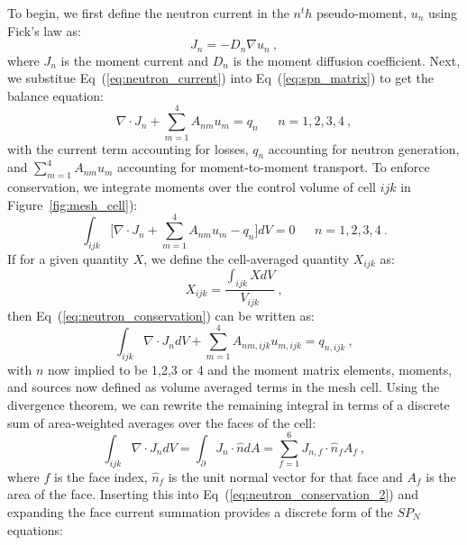 To begin, we first define the neutron current in the $n^th$
pseudo-moment, $u_n$ using Fick's law as:
\begin{equation}
  J_n = -D_n \nabla u_n\:,
  \label{eq:neutron_current}
\end{equation}
where $J_n$ is the moment current and $D_n$ is the moment diffusion
coefficient. Next, we substitue Eq~(\ref{eq:neutron_current}) into
Eq~(\ref{eq:spn_matrix}) to get the balance equation:
\begin{equation}
    \nabla \cdot J_n + \sum_{m=1}^4 A_{nm} u_m = q_n\ \ \ \ \ \ \ n =
    1,2,3,4\:,
  \label{eq:neutron_balance}
\end{equation}
with the current term accounting for losses, $q_n$ accounting for
neutron generation, and $\sum_{m=1}^4 A_{nm} u_m$ accounting for
moment-to-moment transport. To enforce conservation, we integrate
moments over the control volume of cell $ijk$ in Figure~\ref{fig:mesh_cell}):
\begin{equation}
    \int_{ijk} \Bigg[\nabla \cdot J_n + \sum_{m=1}^4 A_{nm} u_m - q_n
      \Bigg] dV = 0 \ \ \ \ \ \ \ n = 1,2,3,4\:.
  \label{eq:neutron_conservation}
\end{equation}
If for a given quantity $X$, we define the cell-averaged quantity
$X_{ijk}$ as:
\begin{equation}
  X_{ijk} = \frac{\int_{ijk} X dV }{V_{ijk}}\:,
  \label{eq:cell_averaged_quant}
\end{equation}
then Eq~(\ref{eq:neutron_conservation}) can be written as:
\begin{equation}
  \int_{ijk} \nabla \cdot J_n dV + \sum_{m=1}^4 A_{nm,ijk} u_{m,ijk} = q_{n,ijk}\:,
  \label{eq:neutron_conservation_2}
\end{equation}
with $n$ now implied to be 1,2,3 or 4 and the moment matrix elements,
moments, and sources now defined as volume averaged terms in the mesh
cell. Using the divergence theorem, we can rewrite the remaining
integral in terms of a discrete sum of area-weighted averages over the
faces of the cell:
\begin{equation}
  \int_{ijk} \nabla \cdot J_n dV = \int_{\partial} J_n \cdot \hat{n}
  dA = \sum_{f=1}^6 J_{n,f} \cdot \hat{n}_f A_f\:,
\label{eq:face_currents}
\end{equation}
where $f$ is the face index, $\hat{n}_f$ is the unit normal vector for
that face and $A_f$ is the area of the face. Inserting this into
Eq~(\ref{eq:neutron_conservation_2}) and expanding the face current
summation provides a discrete form of the $SP_N$ equations:
